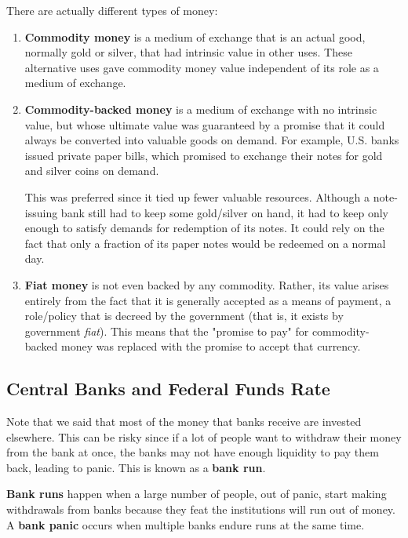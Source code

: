 \documentclass{article}
\begin{document}
    \begin{definition}
      \label{def:types-of-money}
      There are actually different types of money: 
      \begin{enumerate}
        \item \textbf{Commodity money} is a medium of exchange that is an actual good, normally gold or silver, that had intrinsic value in other uses. These alternative uses gave commodity money value independent of its role as a medium of exchange. 

        \item \textbf{Commodity-backed money} is a medium of exchange with no intrinsic value, but whose ultimate value was guaranteed by a promise that it could always be converted into valuable goods on demand. For example, U.S. banks issued private paper bills, which promised to exchange their notes for gold and silver coins on demand. 
        
        This was preferred since it tied up fewer valuable resources. Although a note-issuing bank still had to keep some gold/silver on hand, it had to keep only enough to satisfy demands for redemption of its notes. It could rely on the fact that only a fraction of its paper notes would be redeemed on a normal day. 

        \item \textbf{Fiat money} is not even backed by any commodity. Rather, its value arises entirely from the fact that it is generally accepted as a means of payment, a role/policy that is decreed by the government (that is, it exists by government \textit{fiat}). This means that the "promise to pay" for commodity-backed money was replaced with the promise to accept that currency. 
      \end{enumerate}
    \end{definition}

  \subsection{Central Banks and Federal Funds Rate} 

    Note that we said that most of the money that banks receive are invested elsewhere. This can be risky since if a lot of people want to withdraw their money from the bank at once, the banks may not have enough liquidity to pay them back, leading to panic. This is known as a \textbf{bank run}. 

    \begin{definition}
      \label{def:bank-runs-failures}
      \textbf{Bank runs} happen when a large number of people, out of panic, start making withdrawals from banks because they feat the institutions will run out of money. A \textbf{bank panic} occurs when multiple banks endure runs at the same time. 
    \end{definition}
\end{document}
